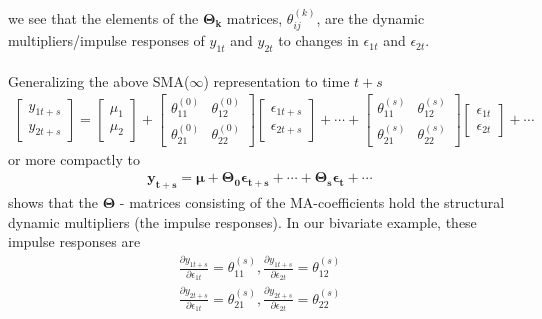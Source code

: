 \documentclass[a4paper,11pt,listof=nochaptergap,oneside,pointednumbers,bibtotoc,bigheadings,liststotoc]{scrbook}
\theoremstyle{mysatz}
\theoremstyle{mydefinition}
\theoremstyle{mybemerkung}
\newcommand{\vect}[1]{\boldsymbol{\mathbf{#1}}}
\begin{document}
we see that the elements of the $\vect{\Theta_k}$ matrices, $\theta_{ij}^{(k)}$, are the dynamic multipliers/impulse responses of $y_{1t}$ and $y_{2t}$ to changes in $\epsilon_{1t}$ and $\epsilon_{2t}$.\\
\\
Generalizing the above SMA($\infty$) representation to time $t+s$
\begin{equation} \label{eq:svar10}
\begin{split}
	\begin{bmatrix}
    	y_{1t+s} \\
    	y_{2t+s}
 	\end{bmatrix} 
	=
	\begin{bmatrix}
    	\mu_1 \\
    	\mu_2
 	\end{bmatrix} + 
	\begin{bmatrix}
    	\theta_{11}^{(0)} & \theta_{12}^{(0)}\\
    	\theta_{21}^{(0)} & \theta_{22}^{(0)}
 	\end{bmatrix} 
	\begin{bmatrix}
    	\epsilon_{1t + s} \\
	\epsilon_{2t+s}
 	\end{bmatrix} + \cdots +
	\begin{bmatrix}
    	\theta_{11}^{(s)} & \theta_{12}^{(s)}\\
    	\theta_{21}^{(s)} & \theta_{22}^{(s)}
 	\end{bmatrix} 
	\begin{bmatrix}
    	\epsilon_{1t} \\
	\epsilon_{2t}
 	\end{bmatrix} + \cdots 
\end{split}								
\end{equation}
or more compactly to 
\begin{equation} \label{eq:svar8_1}
\begin{split}
 		\vect{y_{t+s}} = \vect{\mu} + \vect{\Theta_0}\vect{\epsilon_{t+s}} + \cdots + \vect{\Theta_s}\vect{\epsilon_{t}} + \cdots
\end{split}								
\end{equation}
shows that the $\vect{\Theta}$ - matrices consisting of the MA-coefficients hold the structural dynamic multipliers (the impulse responses). In our bivariate example, these impulse responses are
\begin{equation} \label{eq:svar9}
\begin{split}
 		\frac{\partial y_{1t+s}}{\partial \epsilon_{1t}} = \theta_{11}^{(s)}, \frac{\partial y_{1t+s}}{\partial \epsilon_{2t}} = \theta_{12}^{(s)} \\
		\frac{\partial y_{2t+s}}{\partial \epsilon_{1t}} = \theta_{21}^{(s)}, \frac{\partial y_{2t+s}}{\partial \epsilon_{2t}} = \theta_{22}^{(s)}
\end{split}								
\end{equation}
\end{document}
